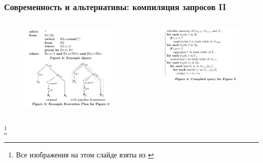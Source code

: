 \documentclass{beamer}
\begin{document}
\begin{frame}[fragile]
	\frametitle{Современность и альтернативы: компиляция запросов II}

	\begin{columns}
		\begin{column}{0.48\textwidth}
			\begin{figure}[htb]
			\includegraphics[width=\textwidth,height=0.40\textheight,keepaspectratio]{compilation-2.png} 
			\end{figure}
		\end{column}
		\begin{column}{0.48\textwidth}
			\begin{figure}[htb]
			\includegraphics[width=\textwidth,height=0.40\textheight,keepaspectratio]{compilation-3.png}
			\end{figure}
		\end{column}
	\end{columns}
\footnote{\tiny{Все изображения на этом слайде взяты из \cite{Neumann2011}}} 

	
\end{frame}
\end{document}
